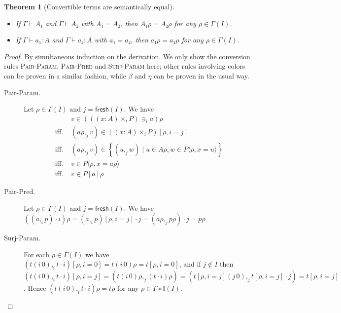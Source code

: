 \documentclass[english]{PaperTools/latex/entcs}
\theoremstyle{plain}
\newtheorem{theorem}{Theorem}
\theoremstyle{definition}
\theoremstyle{remark}
\newcommand\CTimes[2]{(#2) ×_{#1}}
\newcommand\param[1]{\!\cdot\!#1}
\newcommand\op[1]{∋_{#1}}
\def\fresh#1{\mathsf{fresh}(#1)}
\begin{document}
\begin{theorem}[Convertible terms are semantically equal]~
  \label{thm:convertible-in-model}
  \begin{itemize}
    \item If $Γ ⊢ A₁$ and $Γ ⊢ A₂$ with $A₁ = A₂$, then
      $A₁ρ = A₂ρ$ for any $ρ ∈ Γ(I)$.
    \item If $Γ ⊢ a₁ : A$ and $Γ ⊢ a₂ : A$ with $a₁ = a₂$, then
      $a₁ρ = a₂ρ$ for any $ρ ∈ Γ(I)$.
  \end{itemize}
\end{theorem}
\begin{proof}
  By simultaneous induction on the derivation.
  We only show the conversion rules \textsc{Pair-Param},
  \textsc{Pair-Pred} and \textsc{Surj-Param} here; other rules involving
  colors can be proven in a similar fashion, while $β$ and $η$ can be
  proven in the usual way.

  \begin{description}
    \item[\sc Pair-Param.]
      Let $ρ ∈ Γ(I)$ and $j = \fresh I$.  We have\\[-1.5\baselineskip]%
      \begin{align*}
        &v ∈ ({((x:A)\times_i P)} \op {i} a)ρ
        \\
        \text{ iff. }& (aρ ,_j v) ∈ (\CTimes i {x:A} P)[ρ,i=j]
        \\
        \text{ iff. }& (aρ ,_j v) ∈ \left\{ (u ,_j w) \mid u ∈ Aρ, w ∈ P⟨ρ,x=u⟩ \right\}
        \\
        \text{ iff. }& v ∈ P⟨ρ,x=aρ⟩
        \\
        \text{ iff. }& v ∈ P[a]ρ
      \end{align*}

    \item[\sc Pair-Pred.]
      Let $ρ ∈ Γ(I)$ and $j = \fresh I$.  We have
      $ ((a ,_i p) \param i)ρ
      = (a ,_i p)[ρ,i=j]·j
      = (aρ ,_j pρ) · j
      = pρ$

    \item[\sc Surj-Param.]
      For each $ρ ∈ Γ(I)$ we have
      $(t(i\,0) ,_i t·i)[ρ,i=0] = t(i\,0)ρ = t[ρ,i=0]$, and
      if $j ∉ I$ then
      $ (t(i\,0) ,_i t·i)[ρ,i=j]
      = (t(i\,0)ρ ,_j (t·i)ρ)
      = (t[ρ,i=j](j\,0) ,_j t[ρ,i=j]·j)
      = t[ρ,i=j]$.
      Hence $(t(i\,0) ,_i t·i)ρ = tρ$ for any $ρ ∈ Γ∗𝕀(I)$.
      \qedhere
  \end{description}
\end{proof}
\end{document}
